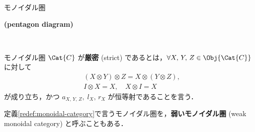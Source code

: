 \documentclass[TQFT_main]{subfiles}
\begin{document}
\begin{mydef}[label=redef:monoidal-category,breakable]{モノイダル圏}
\begin{description}
            \item[\textbf{(pentagon diagram)}]　
            
            \begin{center}
            \end{center}
            
        \end{description}
        
        \tcblower

        モノイダル圏 $\Cat{C}$ が\textbf{厳密} (strict) であるとは，$\forall X,\, Y,\, Z \in \Obj{\Cat{C}}$ に対して
        \begin{align}
            &(X \otimes Y) \otimes Z = X \otimes (Y \otimes Z), \\
            &I \otimes X = X,\quad X \otimes I = X
        \end{align}
        が成り立ち，かつ $a_{X,\, Y,\, Z},\; l_{X},\, r_X$ が恒等射であることを言う．
    \end{mydef}

    \begin{marker}
        定義\ref{redef:monoidal-category}で言うモノイダル圏を，\textbf{弱いモノイダル圏} (weak monoidal category) と呼ぶこともある．
    \end{marker}
\end{document}
